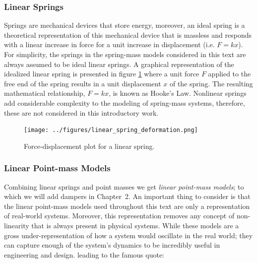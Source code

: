 \documentclass[12pt,letter]{article}
\begin{document}
					
		\subsubsection{Linear Springs}
	
            Springs are mechanical devices that store energy, moreover, an ideal spring is a theoretical representation of this mechanical device that is massless and responds with a linear increase in force for a unit increase in displacement (i.e. $F=kx$). For simplicity, the springs in the spring-mass models considered in this text are always assumed to be ideal linear springs. A graphical representation of the idealized linear spring is presented in figure \ref{fig:linear_spring_deformation} where a unit force $F$ applied to the free end of the spring results in a unit displacement $x$ of the spring.  The resulting mathematical relationship,  $F=kx$, is known as Hooke's Law. Nonlinear springs add considerable complexity to the modeling of spring-mass systems, therefore, these are not considered in this introductory work. 
			
			\begin{figure}[H]
				\centering
				\texttt{[image: ../figures/linear\_spring\_deformation.png]}
				\caption{Force-displacement plot for a linear spring.}
				\label{fig:linear_spring_deformation}
			\end{figure}					

		\subsubsection{Linear Point-mass Models}
		
			Combining linear springs and point masses we get \emph{linear point-mass models}; to which we will add dampers in Chapter~2. An important thing to consider is that the linear point-mass models used throughout this text are only a representation of real-world systems. Moreover, this representation removes any concept of non-linearity that is always present in physical systems. While these models are a gross under-representation of how a system would oscillate in the real world; they can capture enough of the system's dynamics to be incredibly useful in engineering and design. leading to the famous quote:   
\end{document}
